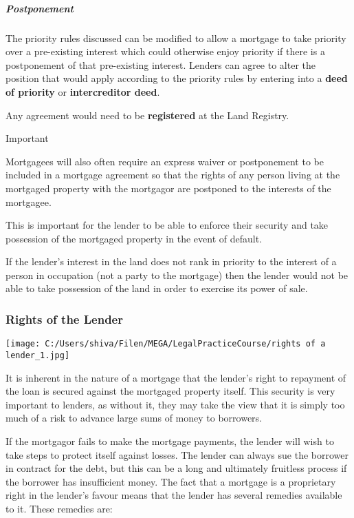 \documentclass[
]{article}
\newenvironment{env-99436a7e-0b1e-438d-960f-947d510b2b61}
{
    \savenotes\tcolorbox[blanker,breakable,left=5pt,borderline west={2pt}{-4pt}{cyan}]
}
{
    \endtcolorbox\spewnotes
}
\begin{document}
\hypertarget{postponement}{%
\subparagraph{Postponement}\label{postponement}}

The priority rules discussed can be modified to allow a mortgage to take
priority over a pre-existing interest which could otherwise enjoy
priority if there is a postponement of that pre-existing interest.
Lenders can agree to alter the position that would apply according to
the priority rules by entering into a \textbf{deed of priority} or
\textbf{intercreditor deed}.

Any agreement would need to be \textbf{registered} at the Land Registry.

\begin{env-99436a7e-0b1e-438d-960f-947d510b2b61}

Important

Mortgagees will also often require an express waiver or postponement to
be included in a mortgage agreement so that the rights of any person
living at the mortgaged property with the mortgagor are postponed to the
interests of the mortgagee.

This is important for the lender to be able to enforce their security
and take possession of the mortgaged property in the event of default.

If the lender's interest in the land does not rank in priority to the
interest of a person in occupation (not a party to the mortgage) then
the lender would not be able to take possession of the land in order to
exercise its power of sale.

\end{env-99436a7e-0b1e-438d-960f-947d510b2b61}

\hypertarget{rights-of-the-lender}{%
\subsubsection{Rights of the Lender}\label{rights-of-the-lender}}

\texttt{[image: C:/Users/shiva/Filen/MEGA/LegalPracticeCourse/rights of a lender\_1.jpg]}

It is inherent in the nature of a mortgage that the lender's right to
repayment of the loan is secured against the mortgaged property itself.
This security is very important to lenders, as without it, they may take
the view that it is simply too much of a risk to advance large sums of
money to borrowers.

If the mortgagor fails to make the mortgage payments, the lender will
wish to take steps to protect itself against losses. The lender can
always sue the borrower in contract for the debt, but this can be a long
and ultimately fruitless process if the borrower has insufficient money.
The fact that a mortgage is a proprietary right in the lender's favour
means that the lender has several remedies available to it. These
remedies are:
\end{document}
